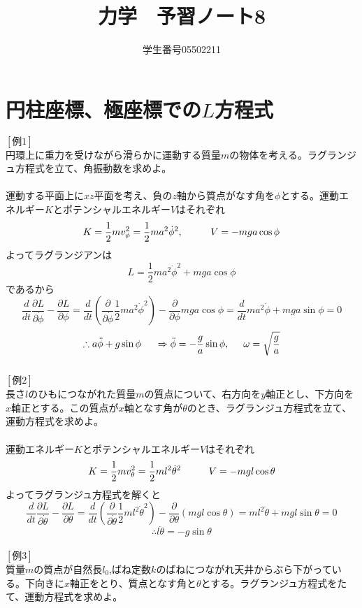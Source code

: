 \documentclass{jsarticle}
\title{力学　予習ノート8}
\author{学生番号05502211}
\date{}
\begin{document}
\maketitle
\section{円柱座標、極座標での\(L\)方程式}
\noindent
\([例1]\)\\
円環上に重力を受けながら滑らかに運動する質量\(m\)の物体を考える。ラグランジュ方程式を立て、角振動数を求めよ。\\
\\
運動する平面上に\(xz\)平面を考え、負の\(z\)軸から質点がなす角を\(\phi\)とする。運動エネルギー\(K\)とポテンシャルエネルギー\(V\)はそれぞれ
\[K=\frac{1}{2}mv_{\phi}^{2}=\frac{1}{2}ma^{2}\dot{\phi}^{2},\hspace{10mm}V=-mga\cos\phi\]
よってラグランジアンは
\[L=\frac{1}{2}ma^{2}\dot{\phi}^{2}+mga\cos\phi\]
であるから
\[\frac{d}{dt}\frac{\partial L}{\partial\dot{\phi}}-\frac{\partial L}{\partial\phi}=\frac{d}{dt}\left(\frac{\partial}{\partial\dot{\phi}}\frac{1}{2}ma^{2}\dot{\phi}^{2}\right)-\frac{\partial}{\partial\phi}mga\cos\phi=\frac{d}{dt}ma^{2}\dot{\phi}+mga\sin\phi=0\]
\[\therefore a\ddot{\phi}+g\sin\phi\hspace{5mm}\Rightarrow\ddot{\phi}=-\frac{g}{a}\sin\phi,\hspace{5mm}\omega=\sqrt{\frac{g}{a}}\]
\\
\([例2]\)\\
長さ\(l\)のひもにつながれた質量\(m\)の質点について、右方向を\(y\)軸正とし、下方向を\(x\)軸正とする。この質点が\(x\)軸となす角が\(\theta\)のとき、ラグランジュ方程式を立て、運動方程式を求めよ。\\
\\
運動エネルギー\(K\)とポテンシャルエネルギー\(V\)はそれぞれ
\[K=\frac{1}{2}mv_{\theta}^{2}=\frac{1}{2}ml^{2}\dot{\theta}^{2}\hspace{10mm}V=-mgl\cos\theta\]
よってラグランジュ方程式を解くと
\[\frac{d}{dt}\frac{\partial L}{\partial\dot{\theta}}-\frac{\partial L}{\partial\theta}=\frac{d}{dt}\left(\frac{\partial }{\partial\dot{\theta}}\frac{1}{2}ml^{2}\dot{\theta}^{2}\right)-\frac{\partial}{\partial\theta}(mgl\cos\theta)=ml^{2}\ddot{\theta}+mgl\sin\theta=0\]
\[\therefore l\ddot{\theta}=-g\sin\theta\]
\\
\([例3]\)\\
質量\(m\)の質点が自然長\(l_{0}\),ばね定数\(k\)のばねにつながれ天井からぶら下がっている。下向きに\(x\)軸正をとり、質点となす角と\(\theta\)とする。ラグランジュ方程式をたて、運動方程式を求めよ。\\
\end{document}
